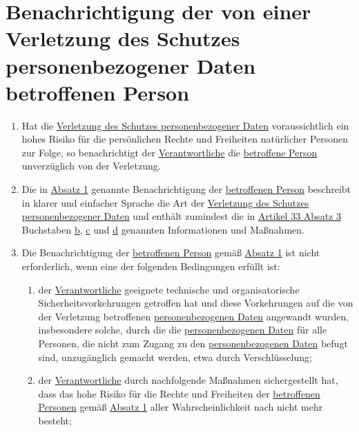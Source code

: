 \chapter{Benachrichtigung der von einer Verletzung des Schutzes personenbezogener Daten betroffenen Person}
\label{ch:34}


\begin{enumerate}

  \item Hat die \hyperref[itm:04-12]{Verletzung des Schutzes personenbezogener Daten} voraussichtlich ein hohes Risiko
   für die persönlichen Rechte und Freiheiten natürlicher Personen zur Folge, so benachrichtigt der \hyperref[itm:04-7]
   {Verantwortliche} die \hyperref[itm:04-1]{betroffene Person} unverzüglich von der Verletzung.
  \label{itm:34-1}

  \item Die in \hyperref[itm:34-1]{Absatz 1} genannte Benachrichtigung der \hyperref[itm:04-1]{betroffenen Person}
   beschreibt in klarer und einfacher Sprache die Art der \hyperref[itm:04-12]{Verletzung des Schutzes
   personenbezogener Daten} und enthält zumindest die in
   \hyperref[itm:33-3]{Artikel 33 Absatz 3} Buchstaben \hyperref[itm:33-3b]{b}, \hyperref[itm:33-3c]{c} und \hyperref
    [itm:33-3d]{d} genannten Informationen und Maßnahmen.
  \label{itm:34-2}

  \item Die Benachrichtigung der \hyperref[itm:04-1]{betroffenen Person} gemäß \hyperref[itm:34-1]{Absatz 1} ist nicht
   erforderlich, wenn eine der folgenden Bedingungen erfüllt ist:
  \label{itm:34-3}

  \begin{enumerate}
  
    \item der \hyperref[itm:04-7]{Verantwortliche} geeignete technische und organisatorische Sicherheitsvorkehrungen
     getroffen hat und diese Vorkehrungen auf die von der Verletzung betroffenen \hyperref[itm:04-1]
     {personenbezogenen Daten} angewandt wurden, insbesondere solche, durch die die \hyperref[itm:04-1]
     {personenbezogenen Daten} für alle Personen, die nicht zum Zugang zu den \hyperref[itm:04-1]
     {personenbezogenen Daten} befugt sind, unzugänglich gemacht werden, etwa durch Verschlüsselung;
    \label{itm:34-3a}

    \item der \hyperref[itm:04-7]{Verantwortliche} durch nachfolgende Maßnahmen sichergestellt hat, dass das hohe Risiko
     für die Rechte und Freiheiten der \hyperref[itm:04-1]{betroffenen Personen} gemäß \hyperref[itm:34-1]{Absatz 1}
     aller Wahrscheinlichkeit nach nicht mehr besteht;
    \label{itm:34-3b}


\end{enumerate}
\end{enumerate}
